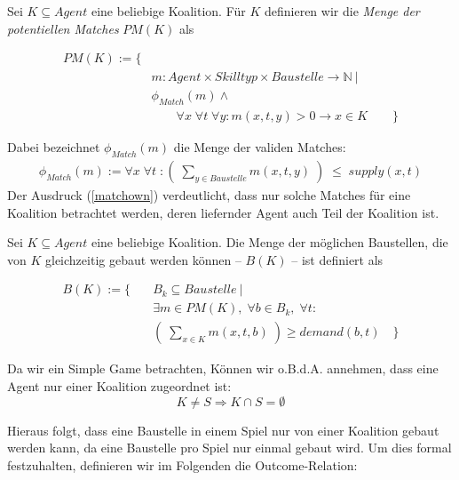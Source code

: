 \begin{definition}
  Sei $K\subseteq Agent$ eine beliebige Koalition. Für $K$ definieren wir die \textit{Menge der potentiellen Matches} $PM(K)$ als

  \begin{eqnarray}
    PM(K) := \{ &\\
    & m: Agent \times Skilltyp \times Baustelle \rightarrow \mathbb{N}\ |\\
    & \phi_{Match}(m) \land \\
    & \quad \quad \forall x\;\forall t\;\forall y: m(x,t, y) > 0 \rightarrow x\in K \quad \quad\} \label{matchown}
  \end{eqnarray}

  Dabei bezeichnet $\phi_{Match}(m)$ die Menge der validen Matches:
  \begin{eqnarray}
    \phi_{Match}(m) := \forall x\; \forall t\; : \left(\;\sum_{y\in Baustelle} m(x,t,y)\;\right)\;\leq \;supply(x,t)
  \end{eqnarray}
  Der Ausdruck (\ref{matchown}) verdeutlicht, dass nur solche Matches für eine Koalition betrachtet werden, deren liefernder Agent auch Teil der Koalition ist.
\end{definition}

\begin{definition}
  Sei $K\subseteq Agent$ eine beliebige Koalition. Die Menge der möglichen Baustellen, die von $K$ gleichzeitig gebaut werden können -- $B(K)$ -- ist definiert als

  \begin{align}
     B(K) := \{\quad &B_k \subseteq Baustelle\ | \\
     &\exists m\in PM(K), \;\forall b\in B_k, \;\forall t: \\
     &\left(\; \sum_{x\in K}m(x,t,b) \;\right)\geq demand(b, t) \quad\}
  \end{align}

\end{definition}

\noindent
Da wir ein Simple Game betrachten, Können wir o.B.d.A. annehmen, dass eine Agent nur einer Koalition zugeordnet ist:
\begin{equation}
  K\neq S \Rightarrow K\cap S =\emptyset \label{koalitiondisjunct}
\end{equation}

\noindent
Hieraus folgt, dass eine Baustelle in einem Spiel nur von einer Koalition gebaut werden kann, da eine Baustelle pro Spiel nur einmal gebaut wird. Um dies formal festzuhalten, definieren wir im Folgenden die Outcome-Relation:

